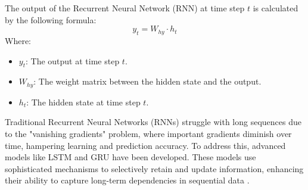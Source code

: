 \documentclass{ieeeojies}
\begin{document}
The output of the Recurrent Neural Network (RNN) at time step \( t \) is calculated by the following formula:
\[
y_t = W_{hy} \cdot h_t
\]
Where:
\begin{itemize}
\item \( y_t \): The output at time step \( t \).
  \item \( W_{hy} \): The weight matrix between the hidden state and the output.
  \item \( h_t \): The hidden state at time step \( t \).
\end{itemize}
Traditional Recurrent Neural Networks (RNNs) struggle with long sequences due to the "vanishing gradients" problem, where important gradients diminish over time, hampering learning and prediction accuracy. To address this, advanced models like LSTM and GRU have been developed. These models use sophisticated mechanisms to selectively retain and update information, enhancing their ability to capture long-term dependencies in sequential data \cite{b16}.
\end{document}
